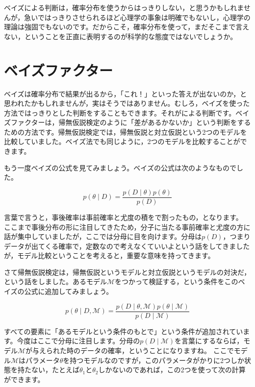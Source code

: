 \documentclass{ltjbook}
\begin{document}
ベイズによる判断は，確率分布を使うからはっきりしない，と思うかもしれませんが，急いではっきりさせられるほど心理学の事象は明確でもないし，心理学の理論は強固でもないのです。だからこそ，確率分布を使って，まだそこまで言えない，ということを正直に表明するのが科学的な態度ではないでしょうか。

\section{ベイズファクター}

ベイズは確率分布で結果が出るから，「これ！」といった答えが出ないのか，と思われたかもしれませんが，実はそうではありません。むしろ，ベイズを使った方法ではっきりとした判断をすることもできます。それがによる判断です。ベイズファクターは，帰無仮説検定のように「差があるかないか」という判断をするための方法です。帰無仮説検定では，帰無仮説と対立仮説という2つのモデルを比較していました。ベイズ法でも同じように，2つのモデルを比較することができます。

もう一度ベイズの公式を見てみましょう。ベイズの公式は次のようなものでした。

\[ p(\theta\mid D) = \frac{p(D\mid \theta)p(\theta)}{p(D)} \]

言葉で言うと，事後確率は事前確率と尤度の積をで割ったもの，となります。
ここまで事後分布の形に注目してきたため，分子に当たる事前確率と尤度の方に話が集中していましたが，ここでは分母に目を向けます。分母は$p(D)$，つまりデータが出てくる確率で，定数なので考えなくていいよという話をしてきましたが，モデル比較ということを考えると，重要な意味を持ってきます。

さて帰無仮説検定は，帰無仮説というモデルと対立仮説というモデルの対決だ，という話をしました。あるモデル$\mathcal{M}$をつかって検証する，という条件をこのベイズの公式に追加してみましょう。

\[ p(\theta \mid D,\mathcal{M}) = \frac{p(D\mid \theta,\mathcal{M})p(\theta \mid \mathcal{M})}{p(D\mid \mathcal{M})} \]

すべての要素に「あるモデルという条件のもとで」という条件が追加されています。今度はここで分母に注目します。分母の$p(D\mid \mathcal{M})$を言葉にするならば，モデル$\mathcal{M}$が与えられた時のデータの確率，ということになりますね。
ここでモデル$\mathcal{M}$はパラメータ$\theta$を持つモデルなのですが，このパラメータがかりに2つしか状態を持たない，たとえば$\theta_1$と$\theta_2$しかないのであれば，この2つを使って次の計算ができます。
\end{document}
